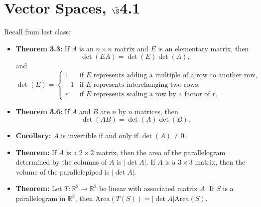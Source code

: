 


%

%

\section{{Vector Spaces, $\vec\S$4.1}}%
% 

%
\thispagestyle{fancy}

Recall from last class:

\begin{itemize}
\item {\bf Theorem 3.3:} If $A$ is an $n\times n$ matrix and $E$ is an elementary matrix, then $$\operatorname{det}(EA)=\operatorname{det}(E) \operatorname{det}(A),$$ and 
$$\operatorname{det}(E)=\begin{cases}
1 & \text{if $E$ represents adding a multiple of a row to another row,}\\
-1 & \text{if $E$ represents interchanging two rows,}\\
r & \text{if $E$ represents scaling a row by a factor of $r$.}
\end{cases}$$
\item {\bf Theorem 3.6:} If $A$ and $B$ are $n$ by $n$ matrices, then $$\operatorname{det}(AB)=\operatorname{det}(A)\operatorname{det}(B).$$
\item {\bf Corollary:} $A$ is invertible if and only if $\operatorname{det}(A)\neq0$.
\item {\bf Theorem:} If $A$ is a $2 \times 2$ matrix, then the area of the parallelogram determined by the columns of $A$ is $|\det{A}|$. If $A$ is a $3 \times 3$ matrix, then the volume of the parallelepiped is $|\det{A}|$.
\item {\bf Theorem:} Let $T: \mathbb{R}^2 \to \mathbb{R}^2$ be linear with associated matrix $A$. If $S$ is a parallelogram in $\mathbb{R}^2$, then $\text{Area}(T(S))=|\det{A}|\text{Area}(S)$. 
\end{itemize}

\newpage

